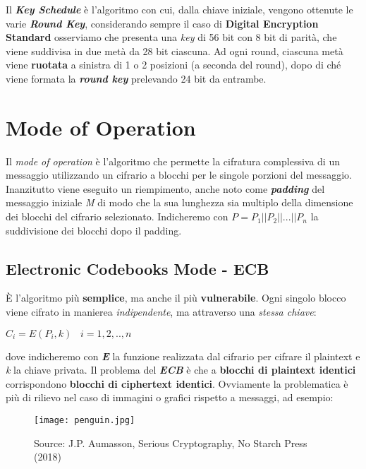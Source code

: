 Il \textbf{\textit{Key Schedule}} è l'algoritmo con cui, dalla chiave iniziale, vengono ottenute le varie \textbf{\textit{Round Key}}, considerando sempre il caso di \textbf{Digital Encryption Standard} osserviamo che presenta una \textit{key} di 56 bit con 8 bit di parità, che viene suddivisa in due metà da 28 bit ciascuna.
\newline
Ad ogni round, ciascuna metà viene \textbf{ruotata} a sinistra di 1 o 2 posizioni (a seconda del round), dopo di ché viene formata la \textbf{\textit{round key}} prelevando 24 bit da entrambe.



\section{Mode of Operation}
Il \textit{mode of operation} è l'algoritmo che permette la cifratura complessiva di un messaggio utilizzando un cifrario a blocchi per le singole porzioni del messaggio. Inanzitutto viene eseguito un riempimento, anche noto come \textbf{\textit{padding}} del messaggio iniziale \textit{M} di modo che la sua lunghezza sia multiplo della dimensione dei blocchi del cifrario selezionato. Indicheremo con $P = P_1||P_2||...||P_n$ la suddivisione dei blocchi dopo il padding.

\subsection{Electronic Codebooks Mode - ECB}
È l'algoritmo più \textbf{semplice}, ma anche il più \textbf{vulnerabile}. Ogni singolo blocco viene cifrato in manierea \textit{indipendente}, ma attraverso una \textit{stessa chiave}: 
\begin{center}
    $C_i = E(P_i, k)\;\;\;i = 1, 2, .., n$
\end{center}
dove indicheremo con \textbf{\textit{E}} la funzione realizzata dal cifrario per cifrare il plaintext e \textit{k} la chiave privata. Il problema del \textbf{\textit{ECB}} è che a \textbf{blocchi di plaintext identici} corrispondono \textbf{blocchi di ciphertext identici}. Ovviamente la problematica è più di rilievo nel caso di immagini o grafici rispetto a messaggi, ad esempio:
\begin{figure}[h]
    \centering
    \texttt{[image: penguin.jpg]}
    \caption{Source: J.P. Aumasson, Serious Cryptography, No Starch Press (2018)}
\end{figure}

